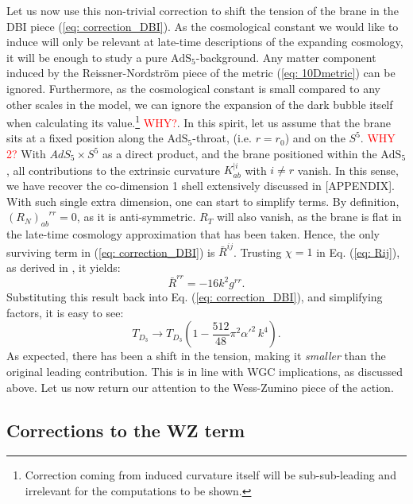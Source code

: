 Let us now use this non-trivial correction to shift the tension of the brane in the DBI piece (\ref{eq: correction_DBI}). As the cosmological constant we would like to induce will only be relevant at late-time descriptions of the expanding cosmology, it will be enough to study a pure $\text{AdS}_5$-background. Any matter component induced by the Reissner-Nordström piece of the metric (\ref{eq: 10Dmetric}) can be ignored. Furthermore, as the cosmological constant is small compared to any other scales in the model, we can ignore the expansion of the dark bubble itself when calculating its value.\footnote{Correction coming from induced curvature itself will be sub-sub-leading and irrelevant for the computations to be shown.} \textcolor{red}{WHY?}. In this spirit, let us assume that the brane sits at a fixed position along the $\text{AdS}_{5}$-throat, (i.e. $r=r_0$) and on the $S^5$. \textcolor{red}{WHY 2?} With $AdS_5 \times S^5$ as a direct product, and the brane positioned within the $\text{AdS}_5$, all contributions to the extrinsic curvature $K_{ab}^{|i}$ with $i\neq r$ vanish. In this sense, we have recover the co-dimension 1 shell extensively discussed in [APPENDIX]. With such single extra dimension, one can start to simplify terms.  By definition, $(R_N)_{ab}^{\quad rr}=0$, as it is anti-symmetric. $R_T$ will also vanish, as the brane is flat in the late-time cosmology approximation that has been taken. Hence, the only surviving term in (\ref{eq: correction_DBI}) is $ \bar{R}^{ij}$. Trusting $\chi=1$ in Eq. (\ref{eq: Rij}), as derived in \cite{Jalali:2015aa}, it yields:
\begin{equation}
    \bar{R}^{rr} = -16 k^2 g^{rr} .
\end{equation}
Substituting this result back into Eq. (\ref{eq: correction_DBI}), and simplifying factors, it is easy to see:
\begin{equation}\label{eq: tension_shift}
    T_{D_{3}} \rightarrow T_{D_{3}} \left(1-\frac{512}{48} \pi^2 \alpha '^2 \, k^4 \right).
\end{equation}
As expected, there has been a shift in the tension, making it \textit{smaller} than the original leading contribution. This is in line with WGC implications, as discussed above. Let us now return our attention to the Wess-Zumino piece of the action.

\subsection*{Corrections to the WZ term}

